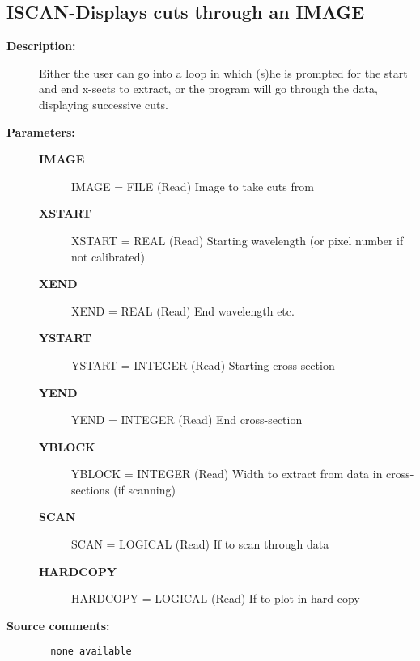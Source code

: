 \subsection{ISCAN-\label{ISCAN}Displays cuts through an IMAGE }
\begin{description}

\item [{\bf Description:}]
   Either the user can go into a loop in which (s)he is prompted for
   the start and end x-sects to extract, or the program will go through
   the data, displaying successive cuts.

\item [{\bf Parameters:}]
\begin{description}
\item [{\bf IMAGE}]
    IMAGE = FILE (Read)
        Image to take cuts from
\item [{\bf XSTART}]
    XSTART = REAL (Read)
        Starting wavelength (or pixel number if not calibrated)
\item [{\bf XEND}]
    XEND = REAL (Read)
        End wavelength etc.
\item [{\bf YSTART}]
    YSTART = INTEGER (Read)
        Starting cross-section
\item [{\bf YEND}]
    YEND = INTEGER (Read)
        End cross-section
\item [{\bf YBLOCK}]
    YBLOCK = INTEGER (Read)
        Width to extract from data in cross-sections (if scanning)
\item [{\bf SCAN}]
    SCAN = LOGICAL (Read)
        If to scan through data
\item [{\bf HARDCOPY}]
    HARDCOPY = LOGICAL (Read)
        If to plot in hard-copy
\end{description}

\item [{\bf Source comments:}]
\begin{verbatim}
  none available

\end{verbatim}
\end{description}

